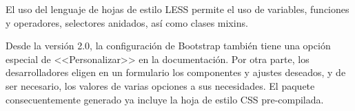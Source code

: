 El uso del lenguaje de hojas de estilo LESS permite el uso de variables, funciones y operadores, selectores anidados, así como clases mixins.

Desde la versión 2.0, la configuración de Bootstrap también tiene una opción especial de <<Personalizar>> en la documentación. Por otra parte, los desarrolladores eligen en un formulario los componentes y ajustes deseados, y de ser necesario, los valores de varias opciones a sus necesidades. El paquete consecuentemente generado ya incluye la hoja de estilo CSS pre-compilada.
















